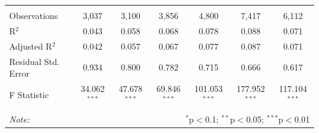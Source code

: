 \documentclass[alpha-refs]{wiley-article-02b}
\begin{document}
\begin{table}[htbp!]
\begin{tabular}{@{\extracolsep{3pt}}lcccccc}
		\hline \\[-1.8ex] 
		Observations & 3,037 & 3,100 & 3,856 & 4,800 & 7,417 & 6,112 \\ 
		R$^{2}$ & 0.043 & 0.058 & 0.068 & 0.078 & 0.088 & 0.071 \\ 
		Adjusted R$^{2}$ & 0.042 & 0.057 & 0.067 & 0.077 & 0.087 & 0.071 \\ 
		Residual Std. Error & 0.934 & 0.800 & 0.782 & 0.715 & 0.666 & 0.617 \\ 
		F Statistic & 34.062$^{***}$ & 47.678$^{***}$ & 69.846$^{***}$ & 101.053$^{***}$ & 177.952$^{***}$ & 117.104$^{***}$ \\ 
		\hline 
		\hline \\[-1.8ex] 
		\textit{Note:}  & \multicolumn{6}{r}{$^{*}$p$<$0.1; $^{**}$p$<$0.05; $^{***}$p$<$0.01} \\ 
	\end{tabular} 
\end{table}

\newpage

\end{document}

